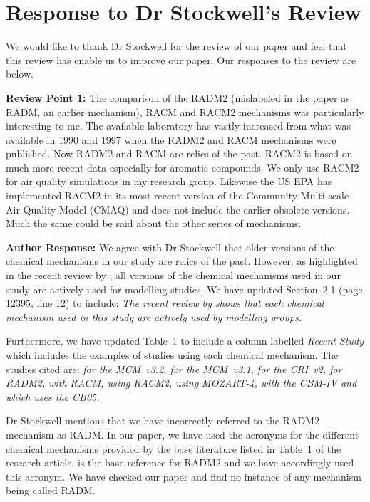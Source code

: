 \documentclass{article}
\begin{document}
\section*{Response to Dr Stockwell's Review}

We would like to thank Dr Stockwell for the review of our paper and feel that this review has enable us to improve our paper.
Our responses to the review are below.

\textbf{Review Point 1: } The comparison of the RADM2 (mislabeled in the paper as RADM, an earlier mechanism), RACM and RACM2 mechanisms was particularly interesting to me. The available laboratory has vastly increased from what was available in 1990 and 1997 when the RADM2 and RACM mechanisms were published. Now RADM2 and RACM are relics of the past. RACM2 is based on much more recent data especially for aromatic compounds. We only use RACM2 for air quality simulations in my research group.  Likewise the US EPA has implemented RACM2 in its most recent version of the Community Multi-scale Air Quality Model (CMAQ) and does not include the earlier obsolete versions. Much the same could be said about the other series of mechanisms.

\textbf{Author Response:} We agree with Dr Stockwell that older versions of the chemical mechanisms in our study are relics of the past.
However, as highlighted in the recent review by \citet{Baklanov:2014}, all versions of the chemical mechanisms used in our study are actively used for modelling studies.
We have updated Section~2.1 (page 12395, line 12) to include:
\textit{The recent review by \citet{Baklanov:2014} shows that each chemical mechanism used in this study are actively used by modelling groups.}

Furthermore, we have updated Table~1 to include a column labelled \textit{Recent Study} which includes the examples of studies using each chemical mechanism. 
The studies cited are:
\textit{\citet{Koss:2015} for the MCM~v3.2, \citet{Lidster:2014} for the MCM~v3.1, \citet{Derwent:2015} for the CRI~v2, \citet{Li:2014} for RADM2, \citet{Ahmadov:2015} with RACM, \citet{Goliff:2015} using RACM2, \citet{Hou:2015} using MOZART-4, \citet{Foster:2014} with the CBM-IV and \citet{Dunker:2015} which uses the CB05.}

Dr Stockwell mentions that we have incorrectly referred to the RADM2 mechanism as RADM.
In our paper, we have used the acronyms for the different chemical mechanisms provided by the base literature listed in Table~1 of the research article.
\citet{Stockwell:1990} is the base reference for RADM2 and we have accordingly used this acronym.
We have checked our paper and find no instance of any mechanism being called RADM.
\end{document}
